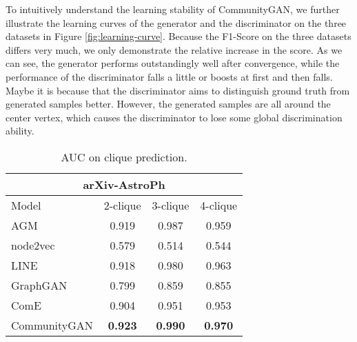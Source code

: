 \documentclass[sigconf]{acmart}
\newcommand{\ComGAN}{CommunityGAN}
\begin{document}
To intuitively understand the learning stability of \ComGAN, we further illustrate the learning curves of the generator and the discriminator on the three datasets in Figure \ref{fig:learning-curve}.
Because the F1-Score on the three datasets differs very much, we only demonstrate the relative increase in the score.
As we can see, the generator performs outstandingly well after convergence, while the performance of the discriminator falls a little or boosts at first and then falls.
Maybe it is because that the discriminator aims to distinguish ground truth from generated samples better.
However, the generated samples are all around the center vertex, which causes the discriminator to lose some global discrimination ability.




\begin{table}[tbp]
\centering
\caption{AUC on clique prediction.}
\label{tab:clique_prediction_result}
\begin{tabular}{cccc}
\multicolumn{4}{c}{arXiv-AstroPh}                                                                                                                       \\ \hline
\multicolumn{1}{|l|}{Model}        & \multicolumn{1}{c|}{2-clique}       & \multicolumn{1}{c|}{3-clique}       & \multicolumn{1}{c|}{4-clique}       \\ \hline \hline
\multicolumn{1}{|l|}{AGM}     & \multicolumn{1}{c|}{0.919}          & \multicolumn{1}{c|}{0.987}          & \multicolumn{1}{c|}{0.959}          \\ \hline
\multicolumn{1}{|l|}{node2vec}     & \multicolumn{1}{c|}{0.579}          & \multicolumn{1}{c|}{0.514}          & \multicolumn{1}{c|}{0.544}          \\ \hline
\multicolumn{1}{|l|}{LINE}         & \multicolumn{1}{c|}{0.918}          & \multicolumn{1}{c|}{0.980}          & \multicolumn{1}{c|}{0.963}          \\ \hline
\multicolumn{1}{|l|}{GraphGAN}     & \multicolumn{1}{c|}{0.799}          & \multicolumn{1}{c|}{0.859}          & \multicolumn{1}{c|}{0.855}          \\ \hline
\multicolumn{1}{|l|}{ComE}         & \multicolumn{1}{c|}{0.904}          & \multicolumn{1}{c|}{0.951}          & \multicolumn{1}{c|}{0.953}          \\ \hline
\multicolumn{1}{|l|}{\ComGAN}      & \multicolumn{1}{c|}{\textbf{0.923}}          & \multicolumn{1}{c|}{\textbf{0.990}} & \multicolumn{1}{c|}{\textbf{0.970}} \\ \hline

\end{tabular}
\end{table}
\end{document}
